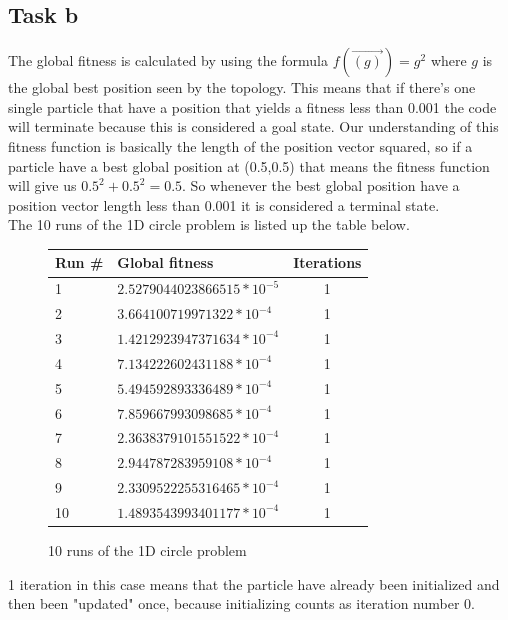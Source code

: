 \documentclass[12pt, a4paper]{article}
\begin{document}
\subsection{Task b}
The global fitness is calculated by using the formula $f(\vec{(g)})=g^2$ where $g$ is the global best position seen by the topology. This means that if there's one single particle that have a position that yields a fitness less than 0.001 the code will terminate because this is considered a goal state. Our understanding of this fitness function is basically the length of the position vector squared, so if a particle have a best global position at (0.5,0.5) that means the fitness function will give us $0.5^2 + 0.5^2 = 0.5$. So whenever the best global position have a position vector length less than 0.001 it is considered a terminal state.\\
The 10 runs of the 1D circle problem is listed up the table below.
\begin{figure}[H]
\begin{center}
\begin{tabular}{l| l  c}
Run \# & Global fitness& Iterations\\ \hline
1&$2.5279044023866515*10^{-5}$ & 1 \\
2&$3.664100719971322*10^{-4}$ & 1 \\
3&$1.4212923947371634*10^{-4}$ & 1 \\
4&$7.134222602431188*10^{-4}$ & 1 \\
5&$5.494592893336489*10^{-4}$ & 1 \\
6&$7.859667993098685*10^{-4}$ & 1 \\
7&$2.3638379101551522*10^{-4}$ & 1 \\
8&$2.944787283959108*10^{-4}$ & 1 \\
9&$2.3309522255316465*10^{-4}$ & 1 \\
10&$1.4893543993401177*10^{-4}$ & 1 \\
\end{tabular}
\caption{10 runs of the 1D circle problem}
\end{center}
\end{figure}
1 iteration in this case means that the particle have already been initialized and then been "updated" once, because initializing counts as iteration number 0.
\end{document}

